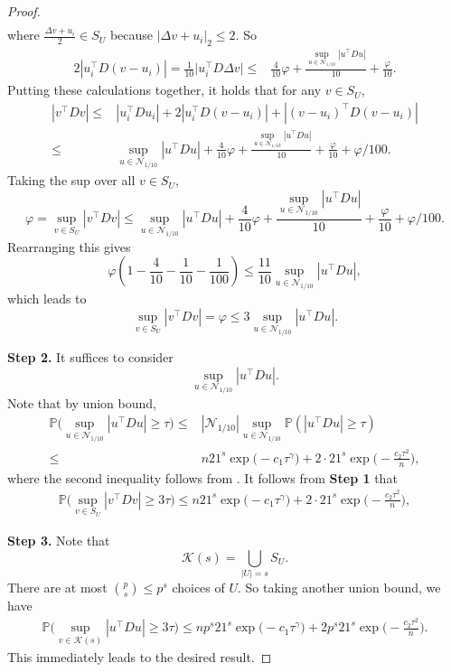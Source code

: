 \documentclass[11pt]{article}
\newcommand{\p}{\mathbb P}
\theoremstyle{plain}
\theoremstyle{definition}
\begin{document}
\begin{proof}
\begin{align*}
\end{align*}
where $ \frac{ \Delta v + u_i}{2 }\in S_U  $ because $ | \Delta v+ u_i   |_2\le 2 $.
So 
\begin{align*}
 2|u_i^\top D (v-u_i) | = \frac{1}{10}   \bigg| u_i^\top D \Delta v   \bigg|  
  \le &  \frac{4}{10} \varphi +  \frac{\sup_{ u \in  \mathcal N_{1/10 }} |u^\top D u| }{10 }  + \frac{\varphi}{10}. 
\end{align*}
Putting these calculations together,
it holds that for any $ v \in S_U$,
\begin{align*}
  | v^\top Dv| \le& | u_i^\top D u_i |+2  |  u_i^\top D (v - u_i) |  + |(v - u_i) ^\top D  (v - u_i) | 
\\
\le &  \sup_{ u \in  \mathcal N_{1/10 }} |u^\top D u|  + \frac{4}{10} \varphi +  \frac{\sup_{ u \in  \mathcal N_{1/10 }} |u^\top D u| }{10 }  + \frac{\varphi}{10} + \varphi/100.
\end{align*}
Taking the sup over  all $v \in S_U$, 
$$\varphi = \sup_{v \in S_U }  | v^\top Dv|  \le  \sup_{ u \in  \mathcal N_{1/10 }} |u^\top D u|  + \frac{4}{10} \varphi +  \frac{\sup_{ u \in  \mathcal N_{1/10 }} |u^\top D u| }{10 }  + \frac{\varphi}{10} + \varphi/100 . $$
Rearranging this gives 
$$\varphi  (1- \frac{4}{10} -\frac{1}{10} -\frac{1}{100}) \le  \frac{11}{10} \sup_{ u \in  \mathcal N_{1/10 }} |u^\top D u|     , $$
which leads to 
$$ \sup_{v \in S_U} | v^\top D v| = \varphi \le 3   \sup_{ u \in  \mathcal N_{1/10 }} |u^\top D u|  .$$
 
 
{\bf Step 2.} It suffices to consider 
$$ \sup_{ u \in  \mathcal N_{1/10 }} |u^\top D u|.$$
Note that by union bound, 
\begin{align*}
\p\bigg( \sup_{ u \in  \mathcal N_{1/10 }} |u^\top D u| \ge \tau  \bigg)
\le& |\mathcal N_{1/10}| \sup_{ u  \in \mathcal N_{1/10 }  } \p (|u^\top D u| \ge \tau  )
\\
\le&   n 21^s  \exp\Big(-c_1  \tau ^{\gamma} \Big) +  2 \cdot  21^s   \exp\Big(-\frac{c_2 \tau ^2}{ n   }\Big) ,
 \end{align*}
 where the second inequality follows from .  It follows from  {\bf Step 1} that 
 \begin{align*}
\p\bigg( \sup_{v \in S_U} | v^\top D v|
  \ge 3\tau  \bigg)
\le  n 21^s  \exp\Big(-c_1  \tau ^{\gamma} \Big) +  2 \cdot  21^s   \exp\Big(-\frac{c_2 \tau ^2}{ n   }\Big) ,
 \end{align*}

{\bf Step 3.} Note that 
$$ \mathcal K(s) = \bigcup_{|U| =  s } S_U . $$
  There are at most 
$ \binom{p}{s} \le p^s $ choices of $U$.
So 
taking another union bound, 
we have  
\begin{align*}
\p\bigg( \sup_{ v  \in   \mathcal K(s) } |u^\top D u| \ge 3\tau  \bigg)
\le    n p^s 21^s  \exp\Big(-c_1  \tau ^{\gamma} \Big) +  2  p^s 21^s   \exp\Big(-\frac{c_2 \tau ^2}{ n   }\Big) .
 \end{align*}
 This immediately leads to the desired result.
\end{proof}
\end{document}
